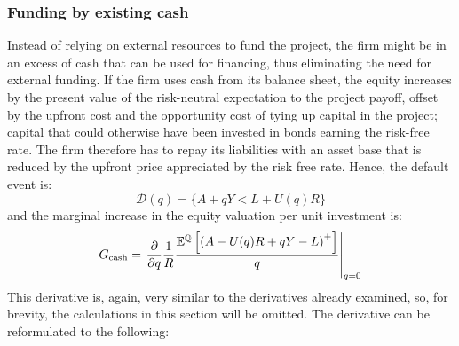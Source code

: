\documentclass[../main.tex]{subfiles}
\begin{document}
    \subsubsection{Funding by existing cash}
        Instead of relying on external resources to fund the project,
        the firm might be in an excess of cash that can be used for financing,
        thus eliminating the need for external funding.
        If the firm uses cash from its balance sheet, the equity increases
        by the present value of the risk-neutral expectation to the project payoff,
        offset by the upfront cost and the opportunity cost of tying up capital in the project;
        capital that could otherwise have been invested in bonds earning the risk-free rate.
        The firm therefore has to repay its liabilities with an asset base that is
        reduced by the upfront price appreciated by the risk free rate.
        Hence, the default event is:
            \begin{equation*}
                \mathcal{D}(q)
                = 
                \{
                    A + qY < L + U(q)R
                \}
            \end{equation*}
        and the marginal increase in the equity valuation per unit investment is:
            \begin{equation*}
                G_{\text{cash}} =
                    \left.
                    \frac{\partial }{\partial q} 
                    \frac{1}{R}
                    \frac{
                        \mathbb{E}^{\mathbb{Q}}\left[
                            \left(
                                A - U(q)R + qY - L
                            \right)^{+}
                        \right] 
                    }{
                        q
                    } 
                    \right\rvert_{q=0}
            \end{equation*}
        This derivative is, again, very similar to the derivatives already examined,
        so, for brevity, the calculations in this section will be omitted.
        The derivative can be reformulated to the following:
\end{document}
